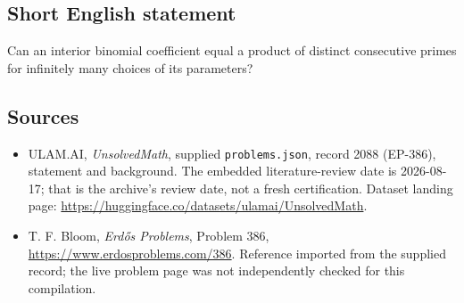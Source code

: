 \documentclass[11pt,a4paper]{article}
\begin{document}
\subsection{Short English statement}

Can an interior binomial coefficient equal a product of distinct consecutive primes for infinitely many choices of its parameters?

\subsection{Sources}

{\small

\begin{itemize}

\item[\hypertarget{source:2088:1}{S1}] ULAM.AI, \emph{UnsolvedMath}, supplied \texttt{problems.json}, record 2088 (EP-386), statement and background. The embedded literature-review date is 2026-08-17; that is the archive’s review date, not a fresh certification. Dataset landing page: \url{https://huggingface.co/datasets/ulamai/UnsolvedMath}.

\item[\hypertarget{source:2088:2}{S2}] T. F. Bloom, \emph{Erdős Problems}, Problem 386, \url{https://www.erdosproblems.com/386}. Reference imported from the supplied record; the live problem page was not independently checked for this compilation.

\end{itemize}

}

\label{end:2088}
\end{document}
